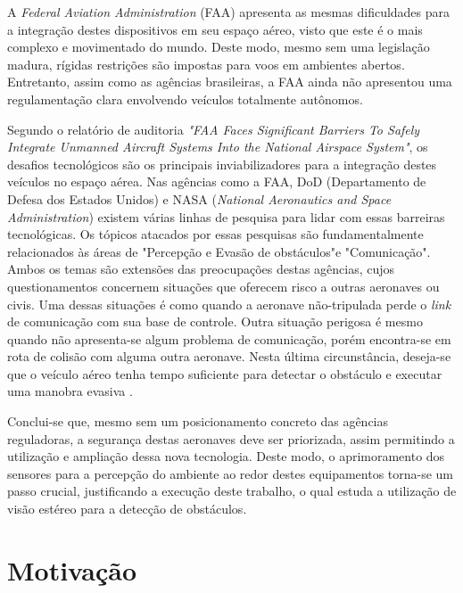 A \textit{Federal Aviation Administration} (FAA) apresenta as mesmas dificuldades para a integração destes dispositivos em seu espaço aéreo, visto que este é o mais complexo e movimentado do mundo. Deste modo, mesmo sem uma legislação madura, rígidas restrições são impostas para voos em ambientes abertos. Entretanto, assim como as agências brasileiras, a FAA ainda não apresentou uma regulamentação clara envolvendo veículos totalmente autônomos. 

Segundo o relatório de auditoria \textit{"FAA Faces Significant Barriers To Safely Integrate Unmanned Aircraft Systems Into the National Airspace System"}, os desafios tecnológicos são os principais inviabilizadores para a integração destes veículos no espaço aérea. Nas agências como a FAA, DoD (Departamento de Defesa dos Estados Unidos) e NASA (\textit{National Aeronautics and Space Administration}) existem várias linhas de pesquisa para lidar com essas barreiras tecnológicas. Os tópicos atacados por essas pesquisas são fundamentalmente relacionados às áreas de "Percepção e Evasão de obstáculos"\space e "Comunicação". Ambos os temas são extensões das preocupações destas agências, cujos questionamentos concernem situações que oferecem risco a outras aeronaves ou civis. Uma dessas situações é como quando a aeronave não-tripulada perde o \textit{link} de comunicação com sua base de controle. Outra situação perigosa é mesmo quando não apresenta-se algum problema de comunicação, porém encontra-se em rota de colisão com alguma outra aeronave. Nesta última circunstância, deseja-se que o veículo aéreo tenha tempo suficiente para detectar o obstáculo e executar uma manobra evasiva \cite{AuditReport2014}.

Conclui-se que, mesmo sem um posicionamento concreto das agências reguladoras, a segurança destas aeronaves deve ser priorizada, assim permitindo a utilização e ampliação dessa nova tecnologia. Deste modo, o aprimoramento dos sensores para a percepção do ambiente ao redor destes equipamentos torna-se um passo crucial, justificando a execução deste trabalho, o qual estuda a utilização de visão estéreo para a detecção de obstáculos.


\section{Motivação}

